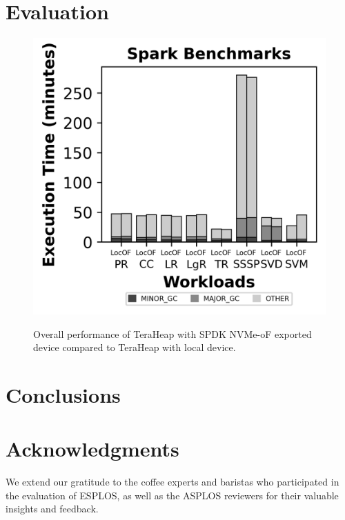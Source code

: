 \documentclass[nonacm,sigplan]{acmart}
\begin{document}
\section{Evaluation}
\begin{figure}[H]
\includegraphics{figures/plot_spark.png}\\
\caption{Overall performance of TeraHeap with SPDK NVMe-oF exported device compared to TeraHeap with local device.}
\label{fig:plot_spark}
\end{figure}
\section{Conclusions}

\section{Acknowledgments}
We extend our gratitude to the coffee experts and baristas who participated in the evaluation of ESPLOS, as well as the ASPLOS reviewers for their valuable insights and feedback.



\end{document}
